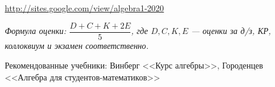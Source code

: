 \documentclass[12pt,a4paper]{article}
\begin{document}

\url{http://sites.google.com/view/algebra1-2020}

\textit{Формула оценки: $\dfrac{D+C+K+2E}{5}$, где $D,C,K,E$ --- оценки за д/з, КР, коллоквиум и экзамен соответственно.}

Рекомендованные учебники: Винберг <<Курс алгебры>>, Городенцев <<Алгебра для студентов-математиков>>
\end{document}
